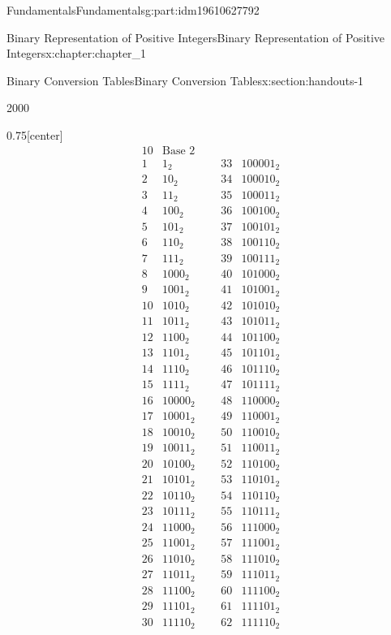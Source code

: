 \documentclass[oneside,10pt,]{book}
\numberwithin{equation}{section}
\begin{document}
\begin{partptx}{Fundamentals}{}{Fundamentals}{}{}{g:part:idm19610627792}
\begin{chapterptx}{Binary Representation of Positive Integers}{}{Binary Representation of Positive Integers}{}{}{x:chapter:chapter_1}
\begin{sectionptx}{Binary Conversion Tables}{}{Binary Conversion Tables}{}{}{x:section:handouts-1}
\begin{sidebyside}{2}{0}{0}{0}
\begin{sbspanel}{0.75}[center]
\begin{equation*}
\begin{array}{ccccc}
{10} & \text{Base 2} \\
1 & 1_2 & \text{     } & 33 &
100001_2 \\
2 & 10_2 & \text{     } & 34
& 100010_2 \\
3 & 11_2 & \text{     } & 35
& 100011_2 \\
4 & 100_2 & \text{     } & 36
& 100100_2 \\
5 & 101_2 & \text{     } & 37
& 100101_2 \\
6 & 110_2 & \text{     } & 38
& 100110_2 \\
7 & 111_2 & \text{     } & 39
& 100111_2 \\
8 & 1000_2 & \text{     } &
40 & 101000_2 \\
9 & 1001_2 & \text{     } &
41 & 101001_2 \\
10 & 1010_2 & \text{     } &
42 & 101010_2 \\
11 & 1011_2 & \text{     } &
43 & 101011_2 \\
12 & 1100_2 & \text{     } &
44 & 101100_2 \\
13 & 1101_2 & \text{     } &
45 & 101101_2 \\
14 & 1110_2 & \text{     } &
46 & 101110_2 \\
15 & 1111_2 & \text{     } &
47 & 101111_2 \\
16 & 10000_2 & \text{     } &
48 & 110000_2 \\
17 & 10001_2 & \text{     } &
49 & 110001_2 \\
18 & 10010_2 & \text{     } &
50 & 110010_2 \\
19 & 10011_2 & \text{     } &
51 & 110011_2 \\
20 & 10100_2 & \text{     } &
52 & 110100_2 \\
21 & 10101_2 & \text{     } &
53 & 110101_2 \\
22 & 10110_2 & \text{     } &
54 & 110110_2 \\
23 & 10111_2 & \text{     } &
55 & 110111_2 \\
24 & 11000_2 & \text{     } &
56 & 111000_2 \\
25 & 11001_2 & \text{     } &
57 & 111001_2 \\
26 & 11010_2 & \text{     } &
58 & 111010_2 \\
27 & 11011_2 & \text{     } &
59 & 111011_2 \\
28 & 11100_2 & \text{     } &
60 & 111100_2 \\
29 & 11101_2 & \text{     } &
61 & 111101_2 \\
30 & 11110_2 & \text{     } &
62 & 111110_2 \\

\end{array}
\end{equation*}
\end{sbspanel}
\end{sidebyside}
\end{sectionptx}
\end{chapterptx}
\end{partptx}
\end{document}
